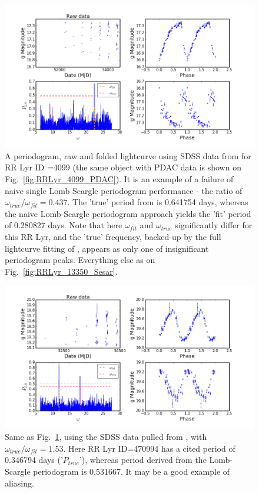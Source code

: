 \documentclass[DM,lsstdraft,toc,usenatbib]{lsstdoc}
\begin{document}
\begin{figure}
\includegraphics[width=\textwidth]{figs/Fig_2_RRLyr_LS_periodogram_ID_4099_g}
\caption{A periodogram, raw and folded lightcurve using SDSS data from \citep{sesar2010}  for RR Lyr ID =4099 (the same object with PDAC data is shown on Fig.~\ref{fig:RRLyr_4099_PDAC}). It is an example of a failure of naive single Lomb Scargle periodogram performance -  the ratio of $\omega_{true} / \omega_{fit} = 0.437$.  The 'true' period from \citep{sesar2010} is  0.641754 days, whereas the naive Lomb-Scargle periodogram approach yields the 'fit' period of 0.280827  days.  Note that here $\omega_{fit}$ and $\omega_{true}$ significantly differ for this RR Lyr,  and the 'true' frequency, backed-up by the full lightcurve fitting of \citep{sesar2010}, appears as only one of insignificant periodogram peaks. Everything else as on Fig.~\ref{fig:RRLyr_13350_Sesar}.}
\label{fig:RRLyr_4099_Sesar}
\end{figure}


\begin{figure}
\includegraphics[width=\textwidth]{figs/Fig_2_RRLyr_LS_periodogram_ID_470994_g}
\caption{Same as Fig.~\ref{fig:RRLyr_4099_Sesar}, using the SDSS data pulled  from \citep{sesar2010}, with $\omega_{true} / \omega_{fit} = 1.53$. Here  RR Lyr ID=470994 has a cited period of 0.346794  days ('$P_{true}$'), whereas period derived from the Lomb-Scargle periodogram is 0.531667. It may be a  good example of aliasing. }
\label{fig:RRLyr_470994_Sesar}
\end{figure}
\end{document}
